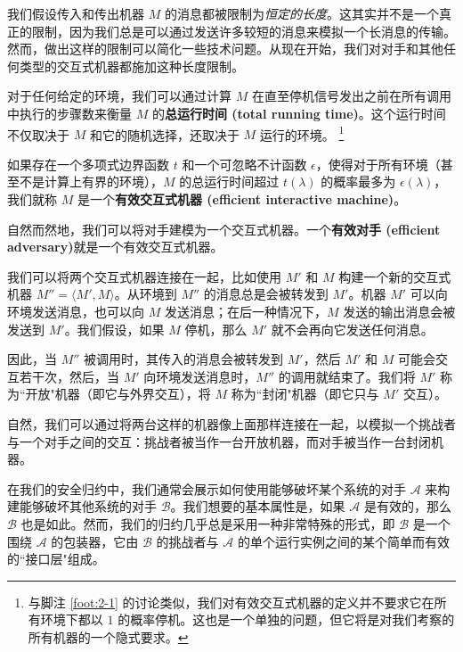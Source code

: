 我们假设传入和传出机器 $M$ 的消息都被限制为\emph{恒定的长度}。这其实并不是一个真正的限制，因为我们总是可以通过发送许多较短的消息来模拟一个长消息的传输。然而，做出这样的限制可以简化一些技术问题。从现在开始，我们对对手和其他任何类型的交互式机器都施加这种长度限制。

对于任何给定的环境，我们可以通过计算 $M$ 在直至停机信号发出之前在所有调用中执行的步骤数来衡量 $M$ 的\textbf{总运行时间 (total running time)}。这个运行时间不仅取决于 $M$ 和它的随机选择，还取决于 $M$ 运行的环境。
\footnote{
与脚注 \ref{foot:2-1} 的讨论类似，我们对有效交互式机器的定义并不要求它在所有环境下都以 $1$ 的概率停机。这也是一个单独的问题，但它将是对我们考察的所有机器的一个隐式要求。
}

\begin{definition}[有效交互式机器]\label{def:2-11}
如果存在一个多项式边界函数 $t$ 和一个可忽略不计函数 $\epsilon$，使得对于所有环境（甚至不是计算上有界的环境），$M$ 的总运行时间超过 $t(\lambda)$ 的概率最多为 $\epsilon(\lambda)$，我们就称 $M$ 是一个\textbf{有效交互式机器 (efficient interactive machine)}。
\end{definition}

自然而然地，我们可以将对手建模为一个交互式机器。一个\textbf{有效对手 (efficient adversary)}就是一个有效交互式机器。

我们可以将两个交互式机器连接在一起，比如使用 $M'$ 和 $M$ 构建一个新的交互式机器 $M''=\langle M',M\rangle$。从环境到 $M''$ 的消息总是会被转发到 $M'$。机器 $M'$ 可以向环境发送消息，也可以向 $M$ 发送消息；在后一种情况下，$M$ 发送的输出消息会被发送到 $M'$。我们假设，如果 $M$ 停机，那么 $M'$ 就不会再向它发送任何消息。

因此，当 $M''$ 被调用时，其传入的消息会被转发到 $M'$，然后 $M'$ 和 $M$ 可能会交互若干次，然后，当 $M'$ 向环境发送消息时，$M''$ 的调用就结束了。我们将 $M'$ 称为``开放"机器（即它与外界交互），将 $M$ 称为``封闭"机器（即它只与 $M'$ 交互）。

\vspace{5pt} 

自然，我们可以通过将两台这样的机器像上面那样连接在一起，以模拟一个挑战者与一个对手之间的交互：挑战者被当作一台开放机器，而对手被当作一台封闭机器。

在我们的安全归约中，我们通常会展示如何使用能够破坏某个系统的对手 $\mathcal{A}$ 来构建能够破坏其他系统的对手 $\mathcal{B}$。我们想要的基本属性是，如果 $\mathcal{A}$ 是有效的，那么 $\mathcal{B}$ 也是如此。然而，我们的归约几乎总是采用一种非常特殊的形式，即 $\mathcal{B}$ 是一个围绕 $\mathcal{A}$ 的包装器，它由 $\mathcal{B}$ 的挑战者与 $\mathcal{A}$ 的单个运行实例之间的某个简单而有效的``接口层"组成。

